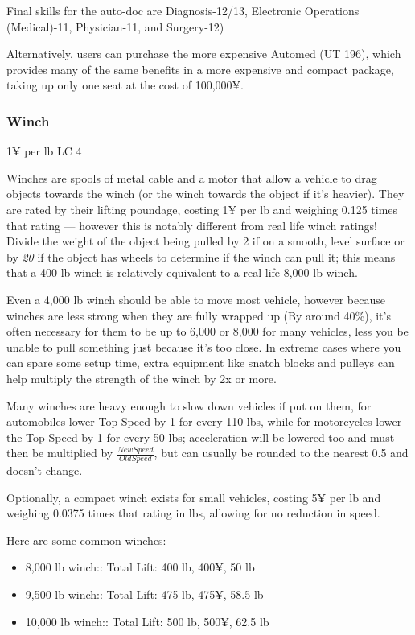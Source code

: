 \begin{multicols*}{2}
	Final skills for the auto-doc are Diagnosis-12/13, Electronic Operations (Medical)-11, Physician-11, and Surgery-12)
	
	Alternatively, users can purchase the more expensive Automed (UT 196), which provides many of the same benefits in a more expensive and compact package, taking up only one seat at the cost of 100,000¥.
		
	\subsubsection{Winch}
	1¥ per lb LC 4
	
	Winches are spools of metal cable and a motor that allow a vehicle to drag objects towards the winch (or the winch towards the object if it's heavier). They are rated by their lifting poundage, costing 1¥ per lb and weighing 0.125 times that rating — however this is notably different from real life winch ratings! Divide the weight of the object being pulled by 2 if on a smooth, level surface or by \textit{20} if the object has wheels to determine if the winch can pull it; this means that a 400 lb winch is relatively equivalent to a real life 8,000 lb winch.
	
	Even a 4,000 lb winch should be able to move most vehicle, however because winches are less strong when they are fully wrapped up (By around 40\%), it's often necessary for them to be up to 6,000 or 8,000 for many vehicles, less you be unable to pull something just because it's too close. In extreme cases where you can spare some setup time, extra equipment like snatch blocks and pulleys can help multiply the strength of the winch by 2x or more. 
	
	Many winches are heavy enough to slow down vehicles if put on them, for automobiles lower Top Speed by 1 for every 110 lbs, while for motorcycles lower the Top Speed by 1 for every 50 lbs; acceleration will be lowered too and must then be multiplied by $\frac{New Speed}{Old Speed}$, but can usually be rounded to the nearest 0.5 and doesn't change.
	
	Optionally, a compact winch exists for small vehicles, costing 5¥ per lb and weighing 0.0375 times that rating in lbs, allowing for no reduction in speed.
	
	Here are some common winches:
	\begin{itemize}
		\itemsep 0pt
		\item 8,000 lb winch:: Total Lift: 400 lb, 400¥, 50 lb
		\item 9,500 lb winch:: Total Lift: 475 lb, 475¥, 58.5 lb
		\item 10,000 lb winch:: Total Lift: 500 lb, 500¥, 62.5 lb
	\end{itemize}
	

\end{multicols*}

